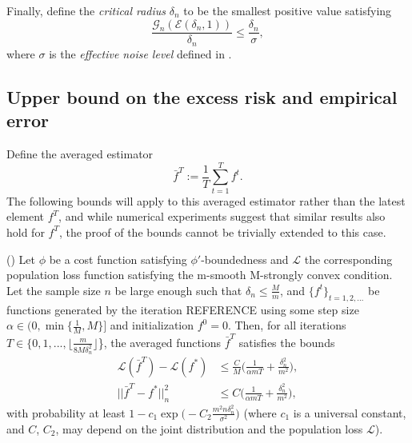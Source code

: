 Finally, define the \textit{critical radius} $\delta_n$ to be the smallest positive value satisfying
\begin{equation}
\frac{\mathcal{G}_n(\mathcal{E}(\delta_n,1))}{\delta_n} \le \frac{\delta_n}{\sigma},
\end{equation}
where $\sigma$ is the \textit{effective noise level} defined in \cite{wei2017early}.

\subsection{Upper bound on the excess risk and empirical error}
Define the averaged estimator
\begin{equation*}
\bar{f}^T := \frac{1}{T}\sum_{t=1}^T f^t.
\end{equation*}
The following bounds will apply to this averaged estimator rather than the latest element $f^T$, and while numerical experiments suggest that similar results also hold for $f^T$, the proof of the bounds cannot be trivially extended to this case.

\begin{theorem}
\label{thmbound}
(\cite{wei2017early}) Let $\phi$ be a cost function satisfying $\phi'$-boundedness and $\mathcal{L}$ the corresponding population loss function satisfying the m-smooth M-strongly convex condition. Let the sample size $n$ be large enough such that $\delta_n\le \frac{M}{m}$, and $\{f^t\}_{t=1,2,...}$ be functions generated by the iteration REFERENCE using some step size $\alpha\in (0,\min\{\frac{1}{M}, M\}]$ and initialization $f^0=0$. Then, for all iterations $T\in \{0,1,...,\lfloor\frac{m}{8M\delta_n^2}\rfloor$\}, the averaged functions $\bar{f}^T$ satisfies the bounds
\begin{align}
\mathcal{L}(\bar{f}^T) - \mathcal{L}(f^*) &\le \frac{C}{M}\Big(\frac{1}{\alpha m T} + \frac{\delta_n^2}{m^2}\Big), \label{bound1} \\
||\bar{f}^T-f^*||_n^2 &\le C\Big(\frac{1}{\alpha m T} + \frac{\delta_n^2}{m^2}\Big), \label{bound2}
\end{align}
with probability at least $1-c_1\exp\big(-C_2\frac{m^2n\delta_n^2}{\sigma^2}\big)$ (where $c_1$ is a universal constant, and $C$, $C_2$, may depend on the joint distribution and the population loss $\mathcal{L}$).
\end{theorem}

